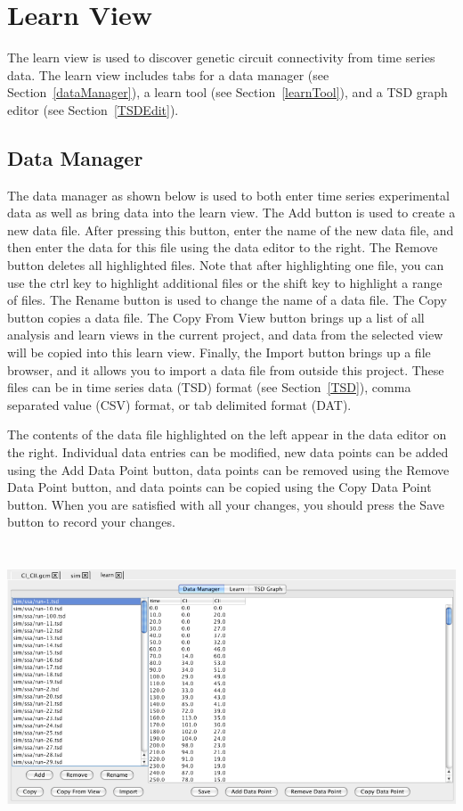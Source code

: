 \documentclass[titlepage,11pt]{article}
\begin{document}
\clearpage

\section{\label{Learn}Learn View}

\noindent
The learn view is used to discover genetic circuit
connectivity from time series data. The learn view includes tabs
for a data manager (see Section~\ref{dataManager}), 
a learn tool (see Section~\ref{learnTool}), and a 
TSD graph editor (see Section~\ref{TSDEdit}).

\subsection{\label{dataManager}Data Manager}

\noindent
The data manager as shown below is used to both enter time series
experimental data as well as bring data
into the learn view.  The Add button is used to create a new data
file. After pressing this button, enter the name of the new data
file, and then enter the data for this file using the data editor
to the right.  The Remove button deletes all highlighted files.
Note that after highlighting one file, you can use the ctrl key
to highlight additional files or the shift key to highlight a
range of files.  The Rename button is used to change the name of a
data file. The Copy button copies a data file. The Copy From View
button brings up a list of all analysis and learn views in the
current project, and data from the selected view will be copied
into this learn view.  Finally, the Import button brings up a file
browser, and it allows you to import a data file from outside
this project.  These files can be in time series data (TSD) format
(see Section~\ref{TSD}), comma separated value (CSV) format, or tab
delimited format (DAT). 

The contents of the data file highlighted on the left appear in the
data editor on the right.  Individual data entries can be modified,
new data points can be added using the Add Data Point button, data 
points can be removed using the Remove Data Point button, and data
points can be copied using the Copy Data Point button.  When you are
satisfied with all your changes, you should press the Save button
to record your changes.
\begin{center}
\includegraphics[height=85mm]{screenshots/dataManager}
\end{center}
\end{document}
